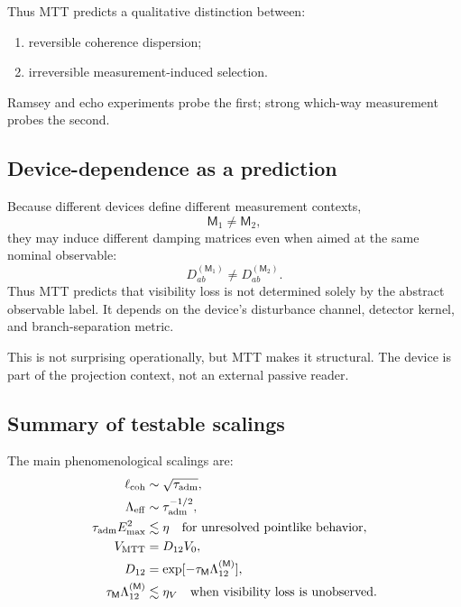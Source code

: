 \documentclass[11pt]{article}
\newcommand{\ta}{\tau_{\mathrm{adm}}}
\newcommand{\Meas}{\mathsf M}
\begin{document}
Thus MTT predicts a qualitative distinction between:
\begin{enumerate}[label=(\roman*)]
  \item reversible coherence dispersion;
  \item irreversible measurement-induced selection.
\end{enumerate}
Ramsey and echo experiments probe the first; strong which-way measurement probes the
second.

\subsection{Device-dependence as a prediction}
\label{subsec:device-dependence-phen}

Because different devices define different measurement contexts,
\begin{equation}
  \Meas_1\neq \Meas_2,
\end{equation}
they may induce different damping matrices even when aimed at the same nominal observable:
\begin{equation}
  D_{ab}^{(\Meas_1)}
  \neq
  D_{ab}^{(\Meas_2)}.
\end{equation}
Thus MTT predicts that visibility loss is not determined solely by the abstract observable
label. It depends on the device's disturbance channel, detector kernel, and branch-separation
metric.

This is not surprising operationally, but MTT makes it structural. The device is part of the
projection context, not an external passive reader.

\subsection{Summary of testable scalings}
\label{subsec:testable-scalings-summary}

The main phenomenological scalings are:
\begin{align}
  \ell_{\rm coh}
  &\sim
  \sqrt{\ta},
  \\
  \Lambda_{\rm eff}
  &\sim
  \ta^{-1/2},
  \\
  \ta E_{\rm max}^2
  &\lesssim
  \eta
  \quad
  \text{for unresolved pointlike behavior},
  \\
  V_{\rm MTT}
  &=
  D_{12}V_0,
  \\
  D_{12}
  &=
  \exp[-\tau_{\Meas}\Lambda_{12}^{(\Meas)}],
  \\
  \tau_{\Meas}\Lambda_{12}^{(\Meas)}
  &\lesssim
  \eta_V
  \quad
  \text{when visibility loss is unobserved}.
\end{align}
\end{document}
